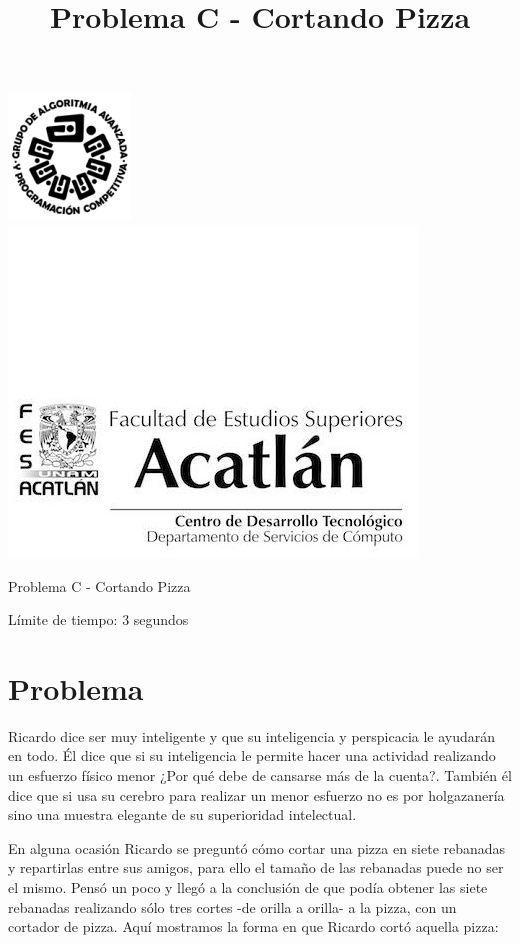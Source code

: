 \documentclass[letter,10pt]{article}
\date{}
\begin{document}
\title{Problema C - Cortando Pizza}

\includegraphics[scale=0.6]{logo} \hspace*{9.00cm}
\includegraphics[scale=0.5]{dsc} 
\bigskip
\begin{center}
	\Large Problema C - Cortando Pizza
\end{center}

\begin{flushright}
Límite de tiempo: 3 segundos
\par\end{flushright}
\bigskip

\section*{Problema}

Ricardo dice ser muy inteligente y que su inteligencia y perspicacia le ayudarán en todo. Él dice que si su inteligencia le permite hacer una actividad realizando un esfuerzo físico menor ¿Por qué debe de cansarse más de la cuenta?. También él dice que si usa su cerebro para realizar un menor esfuerzo no es por holgazanería sino una muestra elegante de su superioridad intelectual. 

En alguna ocasión Ricardo se preguntó cómo cortar una pizza en siete rebanadas y repartirlas entre sus amigos, para ello el tamaño de las rebanadas puede no ser el mismo. Pensó un poco y llegó a la conclusión de que podía obtener las siete rebanadas realizando sólo tres cortes -de orilla a orilla- a la pizza, con un cortador de pizza. Aquí mostramos la forma en que Ricardo cortó aquella pizza: 
\end{document}
